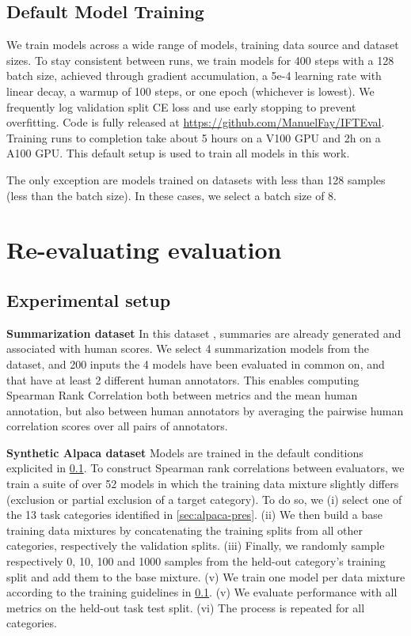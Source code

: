 \subsection{Default Model Training}
\label{sec:default-setup}
 We train models across a wide range of models, training data source and dataset sizes. To stay consistent between runs, we train models for 400 steps with a 128 batch size, achieved through gradient accumulation, a 5e-4 learning rate with linear decay, a warmup of 100 steps, or one epoch (whichever is lowest). We frequently log validation split CE loss and use early stopping to prevent overfitting. Code is fully released at \url{https://github.com/ManuelFay/IFTEval}. Training runs to completion take about 5 hours on a V100 GPU and 2h on a A100 GPU. This default setup is used to train all models in this work.

The only exception are models trained on datasets with less than 128 samples (less than the batch size). In these cases, we select a batch size of 8.


\section{Re-evaluating evaluation}


\subsection{Experimental setup}
\label{sec:exp_setup_1}

\textbf{Summarization dataset} In this dataset , summaries are already generated and associated with human scores. We select 4 summarization models from the dataset, and 200 inputs the 4 models have been evaluated in common on, and that have at least 2 different human annotators. This enables computing Spearman Rank Correlation both between metrics and the mean human annotation, but also between human annotators by averaging the pairwise human correlation scores over all pairs of annotators.

\textbf{Synthetic Alpaca dataset}  Models are trained in the default conditions explicited in \ref{sec:default-setup}. To construct Spearman rank correlations between evaluators, we train a suite of over 52 models in which the training data mixture slightly differs (exclusion or partial exclusion of a target category). To do so, we (i) select one of the 13 task categories identified in \ref{sec:alpaca-pres}. (ii) We then build a base training data mixtures by concatenating the training splits from all other categories, respectively the validation splits. (iii) Finally, we randomly sample respectively 0, 10, 100 and 1000 samples from the held-out category's training split and add them to the base mixture. (v) We train one model per data mixture according to the training guidelines in \ref{sec:default-setup}. (v) We evaluate performance with all metrics on the held-out task test split. (vi) The process is repeated for all categories.


